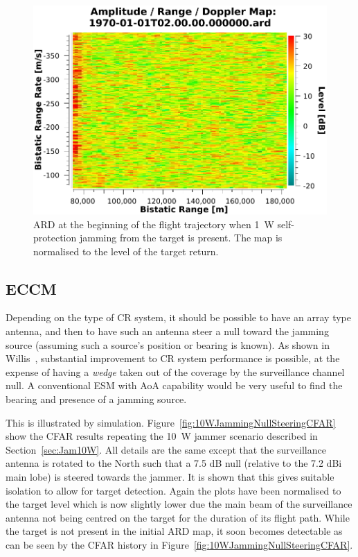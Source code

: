 \documentclass[conference]{IEEEtran}
\begin{document}
\begin{figure}[htbp]
\begin{center}
\includegraphics[width=1.0\columnwidth]{figs/Simulations/1WSelfProtectionARDFirstTargetNormalised.pdf}
\caption[ARD map normalised to target return.]{ARD at the beginning of the flight trajectory when 1~W self-protection jamming from the target is present. The map is normalised to the level of the target return.}
\label{fig:1WSelfProtectionARDFirst_targetNormalised}
\end{center}
\end{figure}

\subsection{ECCM}

Depending on the type of CR system, it should be possible to have an array type antenna, and then to have such an antenna steer a null toward the jamming source (assuming such a source's position or bearing is known). As shown in Willis~\cite{willis:07}, substantial improvement to CR system performance is possible, at the expense of having a \emph{wedge} taken out of the coverage by the surveillance channel null. A conventional ESM with AoA capability would be very useful to find the bearing and presence of a jamming source.

This is illustrated by simulation. Figure~\ref{fig:10WJammingNullSteeringCFAR} show the CFAR results repeating the 10~W jammer scenario described in Section~\ref{sec:Jam10W}. All details are the same except that the surveillance antenna is rotated to the North such that a 7.5 dB null (relative to the 7.2 dBi main lobe) is steered towards the jammer. It is shown that this gives suitable isolation to allow for target detection. Again the plots have been normalised to the target level which is now slightly lower due the main beam of the surveillance antenna not being centred on the target for the duration of its flight path. While the target is not present in the initial ARD map, it soon becomes detectable as can be seen by the CFAR history in Figure~\ref{fig:10WJammingNullSteeringCFAR}. 
\end{document}

